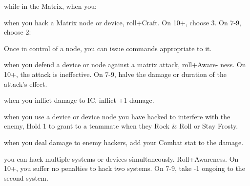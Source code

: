\newpage

\begin{dossier}
\hspace{.5cm}%
\vrule width 2pt
\hspace{.3cm}%
\begin{dossiermovebar}
\fontsize{9pt}{1em}\selectfont
\setlength{\parskip}{.1cm}

 while in
the Matrix, when you:
\begin{moveoptions}



\end{moveoptions}

 when you hack a Matrix node or device, roll+Craft. On 10+, choose 3. On
7-9, choose 2:
\begin{moveoptions}



\end{moveoptions}

Once in control of a node, you can issue commands
appropriate to it.

 when you defend a device or node against a matrix attack, roll+Aware-
ness. On 10+, the attack is ineffective. On 7-9, halve the damage or duration of the attack’s
effect.

 when you
inflict damage to IC, inflict +1 damage.

 when you use a device or device node you have hacked to interfere with
the enemy, Hold 1 to grant to a teammate when they
Rock \& Roll or Stay Frosty.

 when you deal damage to enemy hackers, add your Combat stat to the
damage.

 you can
hack multiple systems or devices
simultaneously. Roll+Awareness. On 10+, you suffer no penalties to hack two systems. On 7-9, take -1 ongoing to the second
system.


\end{dossiermovebar}
\end{dossier}
